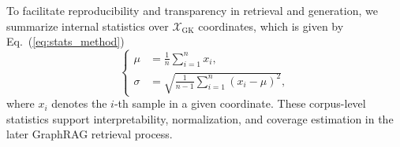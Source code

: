 \documentclass[journal]{IEEEtran}
\begin{document}
To facilitate reproducibility and transparency in retrieval and generation, we summarize internal statistics over $\mathcal{X}_{\mathrm{GK}}$ coordinates, which is given by Eq.~(\ref{eq:stats_method})
\begin{equation}
\left\{
\begin{aligned}
\mu &= \tfrac{1}{n}\sum_{i=1}^{n}x_i, \\
\sigma &= \sqrt{\tfrac{1}{n-1}\sum_{i=1}^{n}(x_i-\mu)^2},
\end{aligned}
\right.
\label{eq:stats_method}
\end{equation}
where $x_i$ denotes the $i$-th sample in a given coordinate. These corpus-level statistics support interpretability, normalization, and coverage estimation in the later GraphRAG retrieval process. 









\end{document}
